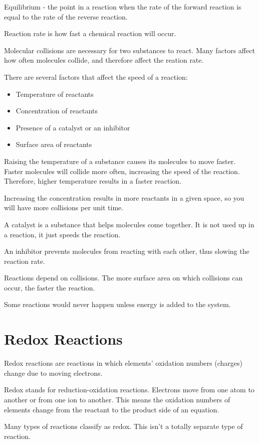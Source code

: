 \documentclass[../hchem.tex]{subfiles}
\begin{document}
Equilibrium - the point in a reaction when the rate of the forward reaction is equal to the rate of the reverse reaction.

Reaction rate is how fast a chemical reaction will occur.

Molecular collisions are necessary for two substances to react. Many factors affect how often molecules collide, and therefore affect the reation rate.

There are several factors that affect the speed of a reaction:
\begin{itemize}
    \item Temperature of reactants 
    \item Concentration of reactants 
    \item Presence of a catalyst or an inhibitor 
    \item Surface area of reactants 
\end{itemize}

Raising the temperature of a substance causes its molecules to move faster. Faster molecules will collide 
more often, increasing the speed of the reaction. Therefore, higher temperature results in a faster reaction.

Increasing the concentration results in more reactants in a given space, so you will have more collisions per unit time.

A catalyst is a substance that helps molecules come together. It is not used up in a reaction, it just speeds the reaction.

An inhibitor prevents molecules from reacting with each other, thus slowing the reaction rate.

Reactions depend on collisions. The more surface area on which collisions can occur, the faster the reaction.

Some reactions would never happen unless energy is added to the system.
\section{Redox Reactions}
Redox reactions are reactions in which elements' oxidation numbers (charges) change due to moving electrons.

Redox stands for reduction-oxidation reactions. Electrons move from one atom to another or from one ion to another. This means the oxidation numbers of elements change from the reactant to the product side of an equation.

Many types of reactions classify as redox. This isn't a totally separate type of reaction.
\end{document}
